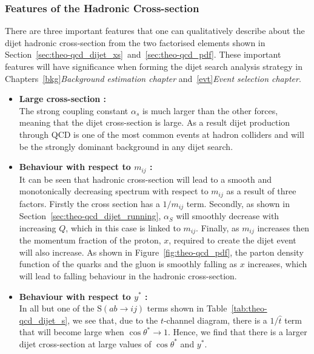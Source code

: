 \subsubsection{Features of the Hadronic Cross-section}

There are three important features that one can qualitatively describe about the dijet hadronic cross-section
from the two factorised elements shown in Section~\ref{sec:theo-qcd_dijet_xs}~and~\ref{sec:theo-qcd_pdf}.
These important features will have significance when forming the dijet search analysis strategy in
Chapters~\ref{bkg}\textit{Background estimation chapter} and~\ref{evt}\textit{Event selection chapter}.

\begin{itemize}[leftmargin=*]
\item\textbf{Large cross-section :}\\
  The strong coupling constant $\alpha_s$ is much larger than the other forces,
  meaning that the dijet cross-section is large.
  As a result dijet production through QCD is one of the most common events at hadron colliders
  and will be the strongly dominant background in any dijet search.\vspace{0.5em}
\item\textbf{Behaviour with respect to $m_{ij}$ :}\\
  It can be seen that hadronic cross-section will
  lead to a smooth and monotonically decreasing spectrum
  with respect to $m_{ij}$ as a result of three factors.
  Firstly the cross section has a $1/m_{ij}$ term.
  Secondly, as shown in Section~\ref{sec:theo-qcd_dijet_running},
  $\alpha_S$ will smoothly decrease with increasing $Q$, which in this case is linked to $m_{ij}$.
  Finally, as $m_{ij}$ increases then the momentum fraction of the proton, $x$, required to create
  the dijet event will also increase.
  As shown in Figure~\ref{fig:theo-qcd_pdf}, the parton density function of the quarks and the gluon
  is smoothly falling as $x$ increases, which will lead to falling behaviour in the hadronic cross-section.
  \vspace{0.5em}
\item\textbf{Behaviour with respect to $y^*$ :}\\
  In all but one of the $\text{S}(ab \to ij)$ terms shown in Table~\ref{tab:theo-qcd_dijet_s},
  we see that, due to the $t$-channel diagram, there is a $1/\hat{t}$ term that will become large when $\cos{\theta^*} \to 1$.
  Hence, we find that there is a larger dijet cross-section at large values of $\cos{\theta^*}$ and $y^*$.
  \vspace{0.5em}
\end{itemize}


